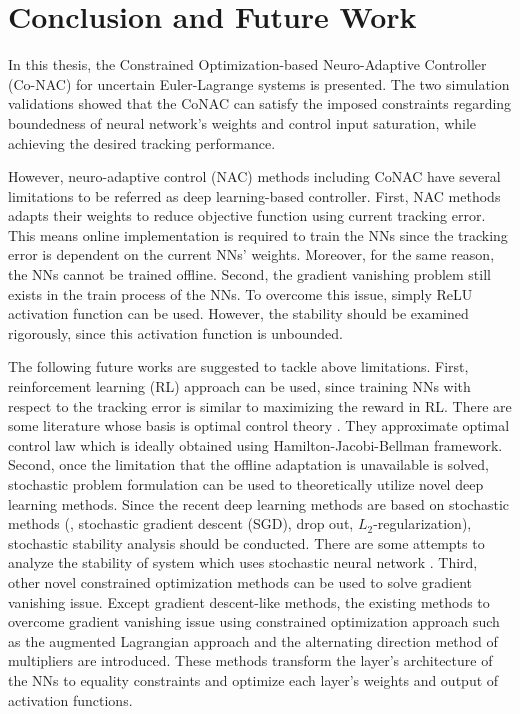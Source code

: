 
\chapter{Conclusion and Future Work} \label{chapter5}

In this thesis, the Constrained Optimization-based Neuro-Adaptive Controller (Co-\allowbreak NAC) for uncertain Euler-Lagrange systems is presented. 
The two simulation validations showed that the CoNAC can satisfy the imposed constraints regarding boundedness of neural network's weights and control input saturation, while achieving the desired tracking performance.

However, neuro-adaptive control (NAC) methods including CoNAC have several limitations to be referred as deep learning-based controller.
First, NAC methods adapts their weights to reduce objective function using current tracking error. 
This means online implementation is required to train the NNs since the tracking error is dependent on the current NNs' weights.
Moreover, for the same reason, the NNs cannot be trained offline.
Second, the gradient vanishing problem still exists in the train process of the NNs.
To overcome this issue, simply ReLU activation function can be used.
However, the stability should be examined rigorously, since this activation function is unbounded.

The following future works are suggested to tackle above limitations.
First, reinforcement learning (RL) approach can be used, since training NNs with respect to the tracking error is similar to maximizing the reward in RL.
There are some literature whose basis is optimal control theory \cite{RN119,RN120,RN121}.
They approximate optimal control law which is ideally obtained using Hamilton-Jacobi-Bellman framework.
Second, once the limitation that the offline adaptation is unavailable is solved, stochastic problem formulation can be used to theoretically utilize novel deep learning methods.
Since the recent deep learning methods are based on stochastic methods (\eg, stochastic gradient descent (SGD), drop out, $L_2$-regularization), stochastic stability analysis should be conducted.
There are some attempts to analyze the stability of system which uses stochastic neural network \cite{RN122,RN123}.
Third, other novel constrained optimization methods can be used to solve gradient vanishing issue.
Except gradient descent-like methods, the existing methods to overcome gradient vanishing issue using constrained optimization approach such as the augmented Lagrangian approach \cite{RN62} and the alternating direction method of multipliers \cite{RN98, RN94} are introduced.
These methods transform the layer's architecture of the NNs to equality constraints and optimize each layer's weights and output of activation functions.

